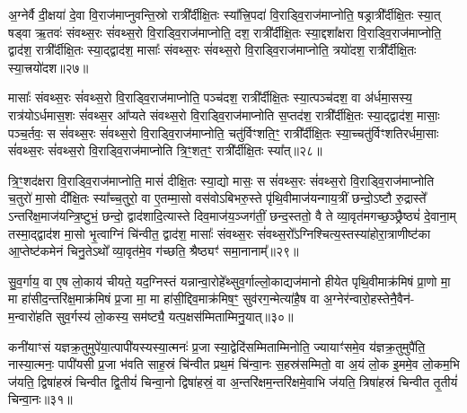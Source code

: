 {\anuvakamend[{अ॒ग्निस्तथ्स॒ꣴ॒स्कृत्या॒ग्नेर्दश॑ च॥६॥}]}

अ॒ग्नेर्वै दी॒क्षया॑ दे॒वा वि॒राज॑माप्नुवन्ति॒स्रो रात्री᳚र्दीक्षि॒तः स्या᳚त्त्रि॒पदा॑ वि॒राड्वि॒राज॑माप्नोति॒ षड्रात्री᳚र्दीक्षि॒तः स्या॒त् षड्वा ऋ॒तवः॑ संवथ्स॒रः सं॑वथ्स॒रो वि॒राड्वि॒राज॑माप्नोति॒ दश॒ रात्री᳚र्दीक्षि॒तः स्या॒द्दशा᳚क्षरा वि॒राड्वि॒राज॑माप्नोति॒ द्वाद॑श॒ रात्री᳚र्दीक्षि॒तः स्या॒द्द्वाद॑श॒ मासाः᳚ संवथ्स॒रः सं॑वथ्स॒रो वि॒राड्वि॒राज॑माप्नोति॒ त्रयो॑दश॒ रात्री᳚र्दीक्षि॒तः स्या॒त्त्रयो॑दश॥२७॥

मासाः᳚ संवथ्स॒रः सं॑वथ्स॒रो वि॒राड्वि॒राज॑माप्नोति॒ पञ्च॑दश॒ रात्री᳚र्दीक्षि॒तः स्या॒त्पञ्च॑दश॒ वा अ॑र्धमा॒सस्य॒ रात्र॑यो\-ऽर्धमास॒शः सं॑वथ्स॒र आ᳚प्यते संवथ्स॒रो वि॒राड्वि॒राज॑माप्नोति स॒प्तद॑श॒ रात्री᳚र्दीक्षि॒तः स्या॒द्द्वाद॑श॒ मासाः॒ पञ्च॒र्तवः॒ स सं॑वथ्स॒रः सं॑वथ्स॒रो वि॒राड्वि॒राज॑माप्नोति॒ चतु॑र्विꣳशति॒ꣳ॒ रात्री᳚र्दीक्षि॒तः स्या॒च्चतु॑र्विꣳशतिरर्धमा॒साः सं॑वथ्स॒रः सं॑वथ्स॒रो वि॒राड्वि॒राज॑माप्नोति त्रि॒ꣳ॒शत॒ꣳ॒ रात्री᳚र्दीक्षि॒तः स्या᳚त्॥२८॥

त्रि॒ꣳ॒शद॑क्षरा वि॒राड्वि॒राज॑माप्नोति॒ मासं॑ दीक्षि॒तः स्या॒द्यो मासः॒ स सं॑वथ्स॒रः सं॑वथ्स॒रो वि॒राड्वि॒राज॑माप्नोति च॒तुरो॑ मा॒सो दी᳚क्षि॒तः स्या᳚च्च॒तुरो॒ वा ए॒तम्मा॒सो वस॑वो\-ऽबिभरु॒स्ते पृ॑थि॒वीमाज॑यन्गाय॒त्रीं छन्दो॒\-ऽष्टौ रु॒द्रास्ते᳚ \-ऽन्तरि॑क्ष॒माज॑यन्त्रि॒ष्टुभं॒ छन्दो॒ द्वाद॑शादि॒त्यास्ते दिव॒माज॑य॒ञ्जग॑तीं॒ छन्द॒स्ततो॒ वै ते व्या॒वृत॑मगच्छ॒ञ्छ्रैष्ठ्यं॑ दे॒वाना॒म् तस्मा॒द्द्वाद॑श मा॒सो भृ॒त्वाग्निं चि॑न्वीत॒ द्वाद॑श॒ मासाः᳚ संवथ्स॒रः सं॑वथ्स॒रो᳚\-ऽग्निश्चित्य॒स्तस्या॑होरा॒त्राणीष्ट॑का आ॒प्तेष्ट॑कमेनं चिनु॒ते\-ऽथो᳚ व्या॒वृत॑मे॒व ग॑च्छति॒ श्रैष्ठ्यꣳ॑ समा॒नानाम्᳚॥२९॥

{\anuvakamend[{स्या॒त्त्रयो॑दश त्रि॒ꣳ॒शत॒ꣳ॒ रात्री᳚र्दीक्षि॒तः स्या॒द्वै ते᳚\-ऽष्टाविꣳ॑शतिश्च॥७॥}]}

सु॒व॒र्गाय॒ वा ए॒ष लो॒काय॑ चीयते॒ यद॒ग्निस्तं यन्नान्वा॒रोहे᳚थ्सुव॒र्गाल्लो॒काद्यज॑मानो हीयेत पृथि॒वीमाक्र॑मिषं प्रा॒णो मा॒ मा हा॑सीद॒न्तरि॑क्ष॒माक्र॑मिषं प्र॒जा मा॒ मा हा॑सी॒द्दिव॒माक्र॑मिष॒ꣳ॒ सुव॑रग॒न्मेत्या॑है॒ष वा अ॒ग्नेर॑न्वारो॒हस्तेनै॒वैन॑- म॒न्वारो॑हति सुव॒र्गस्य॑ लो॒कस्य॒ सम॑ष्ट्यै॒ यत्प॒क्षस॑म्मिताम्मिनु॒यात्॥३०॥

कनी॑याꣳसं यज्ञक्र॒तुमुपे॑या॒त्पापी॑यस्यस्या॒त्मनः॑ प्र॒जा स्या॒द्वेदि॑सम्मिताम्मिनोति॒ ज्यायाꣳ॑समे॒व य॑ज्ञक्र॒तुमुपै॑ति॒ नास्या॒त्मनः॒ पापी॑यसी प्र॒जा भ॑वति साह॒स्रं चि॑न्वीत प्रथ॒मं चि॑न्वा॒नः स॒हस्र॑सम्मितो॒ वा अ॒यं लो॒क इ॒ममे॒व लो॒कम॒भि ज॑यति॒ द्विषा॑हस्रं चिन्वीत द्वि॒तीयं॑ चिन्वा॒नो द्विषा॑हस्रं॒ वा अ॒न्तरि॑क्षम॒न्तरि॑क्षमे॒वाभि ज॑यति॒ त्रिषा॑हस्रं चिन्वीत तृ॒तीयं॑ चिन्वा॒नः॥३१॥

